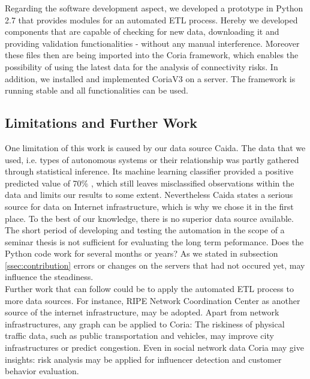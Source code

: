 \documentclass[conference, 11pt]{IEEEtran}
\begin{document}
Regarding the software development aspect, we developed a prototype in Python 2.7 that provides modules for an automated ETL process. Hereby we developed components that are capable of checking for new data, downloading it and providing validation functionalities - without any manual interference. Moreover these files then are being imported into the Coria framework, which enables the possibility of using the latest data for the analysis of connectivity risks. In addition, we installed and implemented CoriaV3 on a server. The framework is running stable and all functionalities can be used. \\
 
\subsection{Limitations and Further Work}
One limitation of this work is caused by our data source Caida. The data that we used, i.e. types of autonomous systems or their relationship was partly gathered through statistical inference. Its machine learning classifier provided a positive predicted value of 70\% \cite{Classification}, which still leaves misclassified observations within the data and limits our results to some extent. Nevertheless Caida states a serious source for data on Internet infrastructure, which is why we chose it in the first place. To the best of our knowledge, there is no superior data source available.  \\  \linebreak
The short period of developing and testing the automation in the scope of a seminar thesis is not sufficient for evaluating the long term peformance. Does the Python code work for several months or years? As we stated in subsection \ref{ssec:contribution} errors or changes on the servers that had not occured yet, may influence the steadiness. \\

Further work that can follow could be to apply the automated ETL process to more data sources. For instance, RIPE Network Coordination Center \cite{RipeNCC} as another source of the internet infrastructure, may be adopted. Apart from network infrastructures, any graph can be applied to Coria: The riskiness of physical traffic data, such as public transportation and vehicles, may improve city infrastructures or predict congestion. Even in social network data Coria may give insights: risk analysis may be applied for influencer detection and customer behavior evaluation.\\
\end{document}
